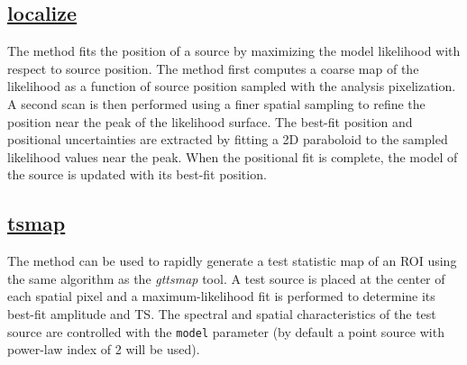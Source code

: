 \documentclass{PoS}
\begin{document}
\subsection{\href{http://fermipy.readthedocs.org/en/\version/advanced/localization.html}{localize}}


The {\localize} method fits the position of a source by maximizing the
model likelihood with respect to source position.  The method first
computes a coarse map of the likelihood as a function of source
position sampled with the analysis pixelization.  A second scan is
then performed using a finer spatial sampling to refine the position
near the peak of the likelihood surface.  The best-fit position and
positional uncertainties are extracted by fitting a 2D
paraboloid to the sampled likelihood values near the peak.  When the
positional fit is complete, the model of the source is updated with
its best-fit position.





\subsection{\href{http://fermipy.readthedocs.org/en/\version/advanced/tsmap.html}{tsmap}}

The {\tsmap} method can be used to rapidly generate a test statistic
map of an ROI using the same algorithm as the \emph{gttsmap} tool.  A
test source is placed at the center of each spatial pixel and a
maximum-likelihood fit is performed to determine its best-fit
amplitude and TS.  The spectral and spatial characteristics of the
test source are controlled with the \lstinline$model$ parameter (by
default a point source with power-law index of 2 will be used).  
\end{document}
